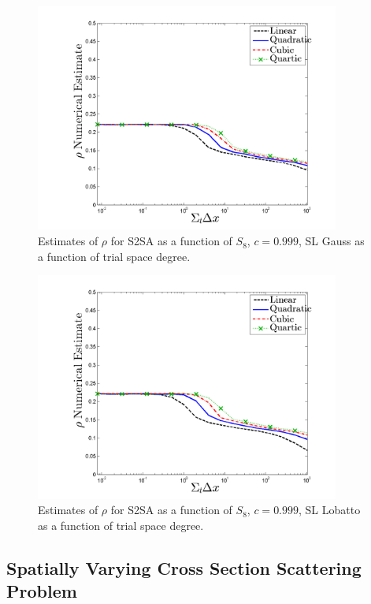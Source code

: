 %
%
\begin{figure}[!htp]
\centering
\includegraphics[width=10cm]{chapter4_acceleration/Constant_XS_SN8_S2SA_Gauss.png}
\caption{Estimates of $\rho$ for S2SA as a function of $S_8$, $c=0.999$, SL Gauss as a function of trial space degree.}
\label{fig:s2sa_gauss}
\end{figure}
%
%
\begin{figure}[!hbp]
\centering
\includegraphics[width=10cm]{chapter4_acceleration/Constant_XS_SN8_S2SA_Lobatto.png}
\caption{Estimates of $\rho$ for S2SA as a function of $S_8$, $c=0.999$, SL Lobatto as a function of trial space degree.}
\label{fig:s2sa_lobatto}
\end{figure}
\pagebreak

\subsection{Spatially Varying Cross Section Scattering Problem}
\label{sec:chap4_variable_xs}

